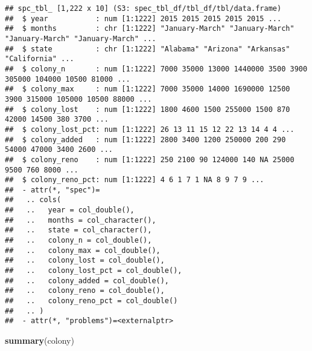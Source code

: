 \documentclass[
]{article}
\newenvironment{Shaded}{\begin{snugshade}}{\end{snugshade}}
\newcommand{\FunctionTok}[1]{\textcolor[rgb]{0.13,0.29,0.53}{\textbf{#1}}}
\newcommand{\NormalTok}[1]{#1}
\begin{document}
\begin{verbatim}
## spc_tbl_ [1,222 x 10] (S3: spec_tbl_df/tbl_df/tbl/data.frame)
##  $ year           : num [1:1222] 2015 2015 2015 2015 2015 ...
##  $ months         : chr [1:1222] "January-March" "January-March" "January-March" "January-March" ...
##  $ state          : chr [1:1222] "Alabama" "Arizona" "Arkansas" "California" ...
##  $ colony_n       : num [1:1222] 7000 35000 13000 1440000 3500 3900 305000 104000 10500 81000 ...
##  $ colony_max     : num [1:1222] 7000 35000 14000 1690000 12500 3900 315000 105000 10500 88000 ...
##  $ colony_lost    : num [1:1222] 1800 4600 1500 255000 1500 870 42000 14500 380 3700 ...
##  $ colony_lost_pct: num [1:1222] 26 13 11 15 12 22 13 14 4 4 ...
##  $ colony_added   : num [1:1222] 2800 3400 1200 250000 200 290 54000 47000 3400 2600 ...
##  $ colony_reno    : num [1:1222] 250 2100 90 124000 140 NA 25000 9500 760 8000 ...
##  $ colony_reno_pct: num [1:1222] 4 6 1 7 1 NA 8 9 7 9 ...
##  - attr(*, "spec")=
##   .. cols(
##   ..   year = col_double(),
##   ..   months = col_character(),
##   ..   state = col_character(),
##   ..   colony_n = col_double(),
##   ..   colony_max = col_double(),
##   ..   colony_lost = col_double(),
##   ..   colony_lost_pct = col_double(),
##   ..   colony_added = col_double(),
##   ..   colony_reno = col_double(),
##   ..   colony_reno_pct = col_double()
##   .. )
##  - attr(*, "problems")=<externalptr>
\end{verbatim}

\begin{Shaded}
\begin{Highlighting}[]
\FunctionTok{summary}\NormalTok{(colony)}
\end{Highlighting}
\end{Shaded}
\end{document}
